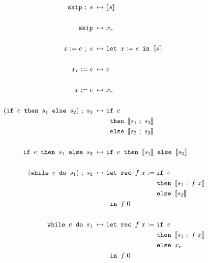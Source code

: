 \documentclass[11pt, leqno, titlepage]{article}
\theoremstyle{definition}
\begin{document}
\begin{align}
  \label{eq:transwhile}
  \texttt{skip}~;~s ~\mapsto~ & \llbracket s \rrbracket\\
  \notag\\
  \texttt{skip}     ~\mapsto~ & x_r\\
  \notag\\
  x := e~;~s        ~\mapsto~ & \texttt{let } x := e \texttt{ in }\llbracket s \rrbracket\\
  \notag\\
  x_r := e          ~\mapsto~ & e \\
  \notag\\
  x := e            ~\mapsto~ & x_r \\
  \notag\\
  (\texttt{if } e \texttt{ then } s_1 \texttt{ else } s_2) ~;~s_3
                    ~\mapsto~ & \texttt{if } e \\
                    &  \texttt{ then } \llbracket s_1 ~;~ s_3 \rrbracket\notag\\
                    & \texttt{ else } \llbracket s_2 ~;~ s_3 \rrbracket \notag\\
  \notag\\
  \texttt{if } e \texttt{ then } s_1 \texttt{ else } s_2
                    ~\mapsto~ & \texttt{if } e
                                  \texttt{ then } \llbracket s_1 \rrbracket
                                  \texttt{ else } \llbracket s_2 \rrbracket \\
  \notag\\
  (\texttt{while } e \texttt{ do } s_1) ~;~ s_2
                    ~\mapsto~ & \texttt{let rec } f~x :=
                                  \texttt{if } e \label{eq:while1}\\
                    & \phantom{{}=11111111111} \texttt{ then } \llbracket s_1 ~;~ f~x \rrbracket \notag\\
                    &\phantom{{}=11111111111}\texttt{ else } \llbracket s_2 \rrbracket\notag\\
                    & \texttt{ in } f~0 \notag \\
  \notag\\
  \texttt{while } e \texttt{ do } s_1
                    ~\mapsto~ & \texttt{let rec } f~x :=
                                 \texttt{if } e \label{eq:while2}\\
                    & \phantom{{}=11111111111}\texttt{ then } \llbracket s_1 ~;~ f~x \rrbracket\notag\\
                    & \phantom{{}=11111111111}\texttt{ else } x_r \notag\\
                    & \texttt{ in } f~0\notag
\end{align}
\end{document}

